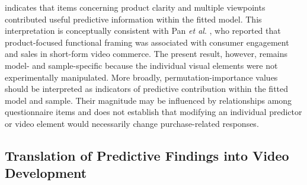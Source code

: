 \documentclass[jtaer,article,submit,moreauthors]{Definitions/mdpi}
\begin{document}
indicates that items concerning product clarity and multiple viewpoints
contributed useful predictive information within the fitted model.
This interpretation is conceptually consistent with Pan
\textit{et al}. \cite{Pan2026}, who reported that product-focused
functional framing was associated with consumer engagement and sales in
short-form video commerce. The present result, however, remains
model- and sample-specific because the individual visual elements were
not experimentally manipulated.
More broadly, permutation-importance values should be interpreted as
indicators of predictive contribution within the fitted model and
sample. Their magnitude may be influenced by relationships among
questionnaire items and does not establish that modifying an individual
predictor or video element would necessarily change purchase-related
responses.

\subsection{Translation of Predictive Findings into Video Development}
\end{document}
